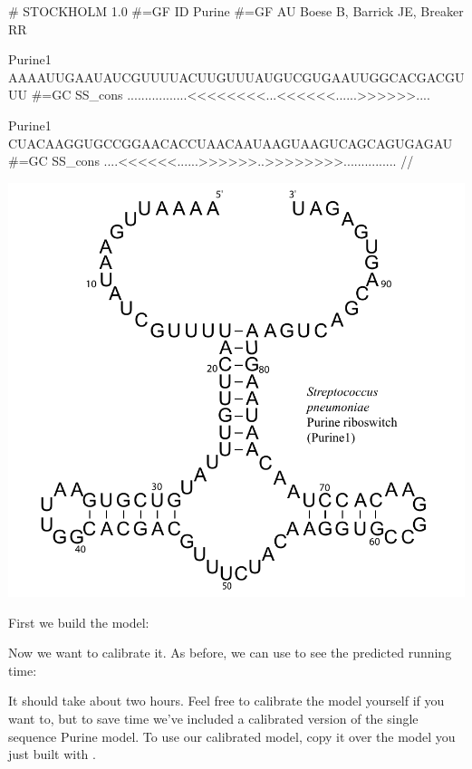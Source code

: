 {\samepage
\vspace{1em}
\begin{minipage}{4.7in}
\begin{sreoutput}
# STOCKHOLM 1.0
#=GF ID    Purine
#=GF AU    Boese B, Barrick JE, Breaker RR

Purine1          AAAAUUGAAUAUCGUUUUACUUGUUUAUGUCGUGAAUUGGCACGACGUUU
#=GC SS_cons     .................<<<<<<<<...<<<<<<......>>>>>>....

Purine1          CUACAAGGUGCCGGAACACCUAACAAUAAGUAAGUCAGCAGUGAGAU
#=GC SS_cons     ....<<<<<<......>>>>>>..>>>>>>>>...............
//
\end{sreoutput}
\end{minipage}
\begin{minipage}{1.5in}
\includegraphics[scale=0.37]{Figures/purine1_full}
\end{minipage}
\vspace{1em}
}

First we build the model:


Now we want to calibrate it. As before, we can use 
to see the predicted running time:


It should take about two hours. Feel free to calibrate the model yourself if you want
to, but to save time we've included  a
calibrated version of the single sequence Purine model. To use our
calibrated model, copy it over the model you just built with 
.


